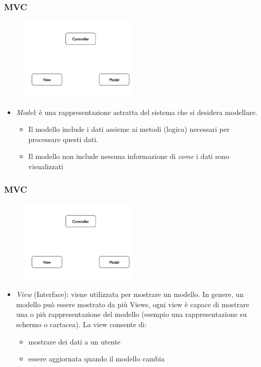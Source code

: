 \documentclass{beamer}
\begin{document}
\begin{frame}
\frametitle{MVC}
\begin{figure}
\centering
\includegraphics[width=0.5\textwidth]{Img/MVC1.pdf}
\end{figure}
\centering
\begin{itemize}
\item \emph{Model}: \`e una rappresentazione astratta del sistema che si desidera modellare. 
\begin{itemize}
\item Il modello include i dati assieme ai metodi (logica) necessari per processare questi dati. 
\item Il modello non include nessuna informazione di \emph{come} i dati sono visualizzati
\end{itemize}
\end{itemize}
\end{frame}

\begin{frame}
\frametitle{MVC}
\begin{figure}
\centering
\includegraphics[width=0.5\textwidth]{Img/MVC1.pdf}
\end{figure}
\begin{itemize}
\item \emph{View} (Interface): viene utilizzata per mostrare un modello. In genere,  un  modello pu\`o essere mostrato da pi\`u Views, ogni view \`e capace di mostrare una o pi\`u rappresentazione del modello (esempio una rappresentazione su schermo o cartacea). La view consente di:
\begin{itemize}
\item mostrare dei dati a un utente
\item essere aggiornata quando il modello cambia
\end{itemize}
\end{itemize}
\end{frame}
\end{document}
